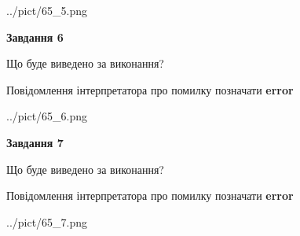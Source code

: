 \documentclass[10pt, ukrainian]{article}
\begin{document}
{\begin {large}
\begin{center}
	{../pict/65_5.png}
\end{center}
\newpage

{\begin {center}\textbf{Завдання 6}\end {center}}\par
Що буде виведено за виконання? \par
Повідомлення інтерпретатора про помилку позначати \textbf{error}

\begin{center}
	{../pict/65_6.png}
\end{center}
\newpage

{\begin {center}\textbf{Завдання 7}\end {center}}\par
Що буде виведено за виконання? \par
Повідомлення інтерпретатора про помилку позначати \textbf{error}

\begin{center}
	{../pict/65_7.png}
\end{center}
\newpage

\end {large}}
\end{document}
